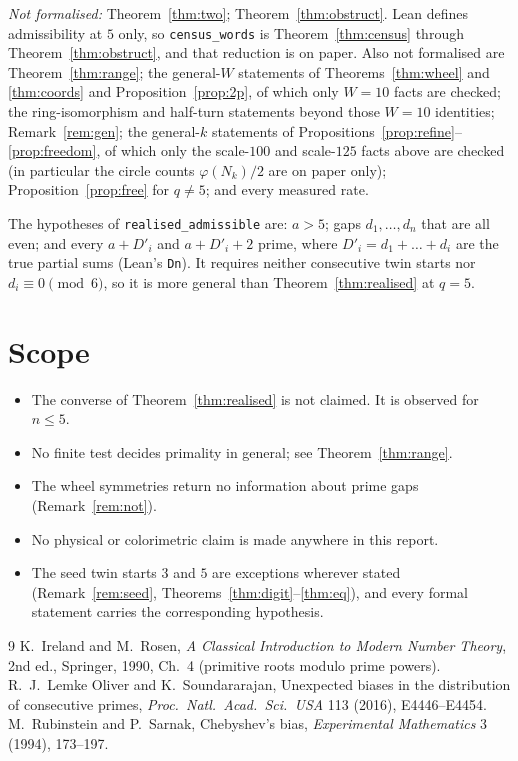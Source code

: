 \documentclass[11pt]{article}
\theoremstyle{plain}
\theoremstyle{definition}
\theoremstyle{remark}
\begin{document}
\noindent
\emph{Not formalised:} Theorem~\ref{thm:two}; Theorem~\ref{thm:obstruct}. Lean defines
admissibility at $5$ only, so \texttt{census\_words} is Theorem~\ref{thm:census} through
Theorem~\ref{thm:obstruct}, and that reduction is on paper. Also not formalised are
Theorem~\ref{thm:range}; the general-$W$ statements of Theorems~\ref{thm:wheel} and \ref{thm:coords}
and Proposition~\ref{prop:2p}, of which only $W=10$ facts are checked; the ring-isomorphism and
half-turn statements beyond those $W=10$ identities; Remark~\ref{rem:gen}; the general-$k$
statements of Propositions~\ref{prop:refine}--\ref{prop:freedom}, of which only the scale-$100$ and
scale-$125$ facts above are checked (in particular the circle counts $\varphi(N_k)/2$ are on paper
only); Proposition~\ref{prop:free} for $q\ne5$; and every measured rate.

\noindent
The hypotheses of \texttt{realised\_admissible} are: $a>5$; gaps $d_1,\dots,d_n$ that are all
even; and every $a+D'_i$ and $a+D'_i+2$ prime, where $D'_i=d_1+\dots+d_i$ are the true partial
sums (Lean's \texttt{Dn}). It requires neither consecutive twin starts nor $d_i\equiv0\pmod6$, so
it is more general than Theorem~\ref{thm:realised} at $q=5$.

\section{Scope}

\begin{itemize}[nosep]
\item The converse of Theorem~\ref{thm:realised} is not claimed. It is observed for $n\le5$.
\item No finite test decides primality in general; see Theorem~\ref{thm:range}.
\item The wheel symmetries return no information about prime gaps (Remark~\ref{rem:not}).
\item No physical or colorimetric claim is made anywhere in this report.
\item The seed twin starts $3$ and $5$ are exceptions wherever stated (Remark~\ref{rem:seed},
Theorems~\ref{thm:digit}--\ref{thm:eq}), and every formal statement carries the corresponding
hypothesis.
\end{itemize}

\begin{thebibliography}{9}
 K.~Ireland and M.~Rosen, \emph{A Classical Introduction to Modern Number Theory}, 2nd
ed., Springer, 1990, Ch.~4 (primitive roots modulo prime powers).
 R.~J.~Lemke Oliver and K.~Soundararajan, Unexpected biases in the distribution of
consecutive primes, \emph{Proc.\ Natl.\ Acad.\ Sci.\ USA} 113 (2016), E4446--E4454.
 M.~Rubinstein and P.~Sarnak, Chebyshev's bias, \emph{Experimental Mathematics} 3
(1994), 173--197.
\end{thebibliography}
\end{document}
